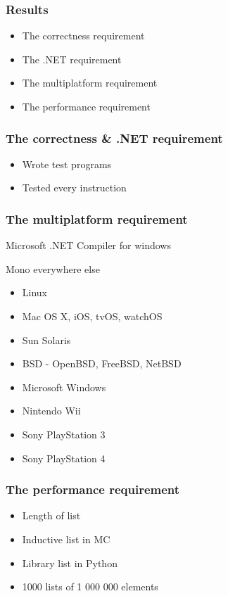 \documentclass[xetex,serif,aspectratio=169]{beamer}
\begin{document}
\begin{frame}[t]
\end{frame}\begin{frame}\frametitle{Results}
\begin{itemize}
    \item The correctness requirement
    \item The .NET requirement
    \item The multiplatform requirement
    \item The performance requirement
\end{itemize}

\end{frame}\begin{frame}\frametitle{The correctness \& .NET requirement}
\begin{itemize}
    \item Wrote test programs
    \item Tested every instruction
\end{itemize}


\end{frame}\begin{frame}\frametitle{The multiplatform requirement}
    Microsoft .NET Compiler for windows

    Mono everywhere else

\begin{itemize}
    \item Linux
    \item Mac OS X, iOS, tvOS, watchOS
    \item Sun Solaris
    \item BSD - OpenBSD, FreeBSD, NetBSD
    \item Microsoft Windows
    \item Nintendo Wii
    \item Sony PlayStation 3
    \item Sony PlayStation 4
\end{itemize}

\end{frame}\begin{frame}\frametitle{The performance requirement}
\begin{itemize}
    \item Length of list
    \item Inductive list in MC
    \item Library list in Python
    \item 1000 lists of 1 000 000 elements
\end{itemize}


\end{frame}
\end{document}
